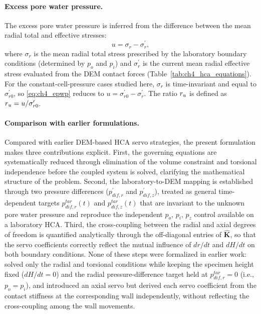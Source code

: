 \documentclass[../main]{subfiles}
\begin{document}
\paragraph{Excess pore water pressure.}
The excess pore water pressure is inferred from the difference between the mean radial total and effective stresses:
\begin{equation}
u = \sigma_r - \sigma_r^{\prime},
\label{eq:ch4_epwp}
\end{equation}
where $\sigma_r$ is the mean radial total stress prescribed by the laboratory boundary conditions (determined by $p_o$ and $p_i$) and $\sigma_r^{\prime}$ is the current mean radial effective stress evaluated from the DEM contact forces (Table~\ref{tab:ch4_hca_equations}). For the constant-cell-pressure cases studied here, $\sigma_r$ is time-invariant and equal to $\sigma_{r0}^{\prime}$, so \cref{eq:ch4_epwp} reduces to $u = \sigma_{r0}^{\prime} - \sigma_r^{\prime}$. The ratio $r_u$ is defined as $r_u = u/\sigma_{r0}^{\prime}$.

\paragraph{Comparison with earlier formulations.}
Compared with earlier DEM-based HCA servo strategies, the present formulation makes three contributions explicit. First, the governing equations are systematically reduced through elimination of the volume constraint and torsional independence before the coupled system is solved, clarifying the mathematical structure of the problem. Second, the laboratory-to-DEM mapping is established through two pressure differences ($p_{dif,r}^{\prime}$ and $p_{dif,z}^{\prime}$), treated as general time-dependent targets $p_{dif,r}^{tar}(t)$ and $p_{dif,z}^{tar}(t)$ that are invariant to the unknown pore water pressure and reproduce the independent $p_o$, $p_i$, $p_z$ control available on a laboratory HCA. Third, the cross-coupling between the radial and axial degrees of freedom is quantified analytically through the off-diagonal entries of $\hat{\mathbf{K}}$, so that the servo coefficients correctly reflect the mutual influence of $dr/dt$ and $dH/dt$ on both boundary conditions. None of these steps were formalized in earlier work: \citet{Han2024jgs} solved only the radial and torsional conditions while keeping the specimen height fixed ($dH/dt=0$) and the radial pressure-difference target held at $p_{dif,r}^{tar}=0$ (i.e., $p_o=p_i$), and \citet{Ma2024} introduced an axial servo but derived each servo coefficient from the contact stiffness at the corresponding wall independently, without reflecting the cross-coupling among the wall movements.
\end{document}
